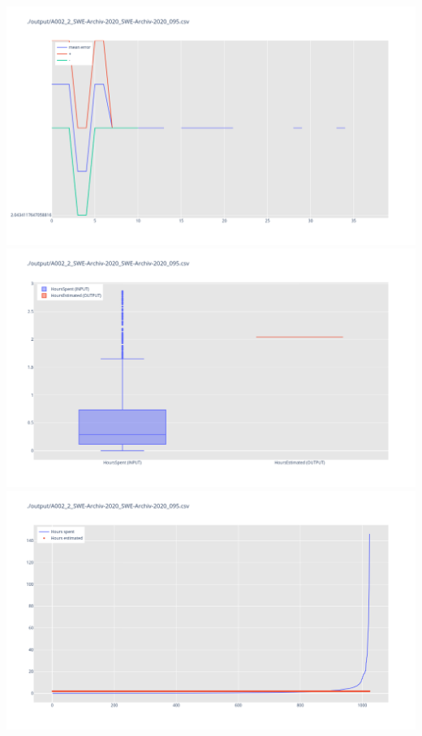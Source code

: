 \includegraphics[width=\textwidth]{Scripts/output/A002_2_SWE-Archiv-2020_SWE-Archiv-2020_095.csv.error_distribution.png}
\includegraphics[width=\textwidth]{Scripts/output/A002_2_SWE-Archiv-2020_SWE-Archiv-2020_095.csv.png}
\includegraphics[width=\textwidth]{Scripts/output/A002_2_SWE-Archiv-2020_SWE-Archiv-2020_095.csv.scatter.png}
